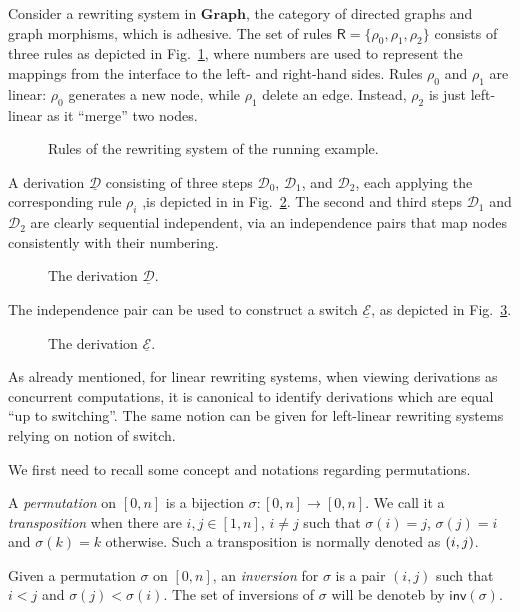 \documentclass[a4paper,UKenglish,cleveref,pdftex, thm-restate,numberwithinsect,anonymous]{lipics}
\newcommand{\cat}[1]{\ensuremath{\mathbf{#1}}}
\newcommand{\interval}[2][1]{\ensuremath{[{#1},{#2}]}}
\newcommand{\perm}{\sigma}
\def\R{\mathsf{R}}
\newcommand{\dder}[1]{\mathscr{#1}}
\newcommand{\der}[1]{\underline{\dder{#1}}}
\newcommand{\inv}[1]{\mathsf{inv}({#1})}
\begin{document}
\begin{example}
  \label{ex:seq-ind}
  Consider a rewriting system in $\cat{Graph}$, the category of
  directed graphs and graph morphisms, which is adhesive. The set of
  rules $\R = \{ \rho_0, \rho_1, \rho_2\}$ consists of three rules as
  depicted in Fig.~\ref{fi:rules}, where numbers are used to represent
  the mappings from the interface to the left- and right-hand
  sides. Rules $\rho_0$ and $\rho_1$ are linear: $\rho_0$ generates a
  new node, while $\rho_1$ delete an edge. Instead, $\rho_2$ is just
  left-linear as it ``merge'' two nodes.


  \begin{figure}
    
    
    \caption{Rules of the rewriting system of the running example.}
    \label{fi:rules}
  \end{figure}
  
  A derivation $\der{D}$ consisting of three steps $\dder{D}_0$,
  $\dder{D}_1$, and $\dder{D}_2$, each applying the corresponding rule
  $\rho_i$ ,is depicted in in Fig.~\ref{fi:derD}. The second and third
  steps $\dder{D}_1$ and $\dder{D}_2$ are clearly sequential
  independent, via an independence pairs that map nodes consistently
  with their numbering.
  
  \begin{figure}
    
    \caption{The derivation $\der{D}$.}
    \label{fi:derD}
  \end{figure}

  The independence pair can be used to construct a switch $\der{E}$, as
  depicted in Fig.~\ref{fi:derE}.
  \begin{figure}
    
    \caption{The derivation $\der{E}$.}
    \label{fi:derE}
  \end{figure}
\end{example}


As already mentioned, for linear rewriting systems, when viewing
derivations as concurrent computations, it is canonical to identify
derivations which are equal ``up to switching''. The same notion can
be given for left-linear rewriting systems relying on notion of
switch.


We first need to recall some concept and notations regarding permutations. 

\begin{definition}
	A \emph{permutation} on
	$\interval[0]{n}$ is a bijection
	$\sigma : \interval[0]{n} \to \interval[0]{n}$. We call it a
	\emph{transposition} when there are $i, j \in \interval{n}$,
	$i \neq j$ such that $\sigma(i)=j$, $\sigma(j) = i$ and
	$\sigma(k) = k$ otherwise. Such a transposition is normally denoted as
	$\transp{i}[j]$.
	
Given a permutation $\perm$ on $\interval[0]{n}$,  an \emph{inversion} for $\sigma$ is a pair $(i,j)$ such that $i<j$ and $\sigma(j)< \sigma(i)$. The set of inversions
of $\perm$ will be denoteb by $\inv{\sigma}$.
\end{definition}
\end{document}
